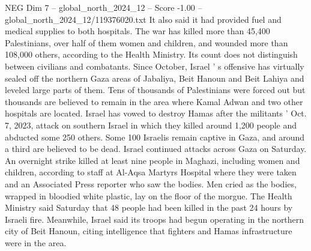 \begin{textsample}{NEG Dim 7 – global\_north\_2024\_12 – Score -1.00 – global\_north\_2024\_12/119376020.txt}
It also said it had provided fuel and medical supplies to both hospitals.
The war has killed more than 45,400 Palestinians, over half of them women and children, and wounded more than 108,000 others, according to the Health Ministry.
Its count does not distinguish between civilians and combatants.
Since October, Israel ' s offensive has virtually sealed off the northern Gaza areas of Jabaliya, Beit Hanoun and Beit Lahiya and leveled large parts of them.
Tens of thousands of Palestinians were forced out but thousands are believed to remain in the area where Kamal Adwan and two other hospitals are located.
Israel has vowed to destroy Hamas after the militants ' Oct. 7, 2023, attack on southern Israel in which they killed around 1,200 people and abducted some 250 others.
Some 100 Israelis remain captive in Gaza, and around a third are believed to be dead.
Israel continued attacks across Gaza on Saturday.
An overnight strike killed at least nine people in Maghazi, including women and children, according to staff at Al-Aqsa Martyrs Hospital where they were taken and an Associated Press reporter who saw the bodies.
Men cried as the bodies, wrapped in bloodied white plastic, lay on the floor of the morgue.
The Health Ministry said Saturday that 48 people had been killed in the past 24 hours by Israeli fire.
Meanwhile, Israel said its troops had begun operating in the northern city of Beit Hanoun, citing intelligence that fighters and Hamas infrastructure were in the area.

\end{textsample}
